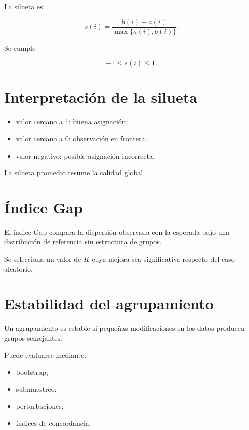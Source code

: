 \documentclass[
  spanish,
  10.5pt,
  letterpaper,
  DIV=11,
  numbers=noendperiod,
  oneside,
  open=any]{scrreprt}
\providecommand{\tightlist}{%
  \setlength{\itemsep}{0pt}\setlength{\parskip}{0pt}}
\theoremstyle{definition}
\theoremstyle{definition}
\theoremstyle{plain}
\theoremstyle{remark}
\begin{document}
La silueta es

\[
s(i)
=
\frac{
b(i)-a(i)
}{
\max\{a(i),b(i)\}
}.
\]

Se cumple

\[
-1\leq s(i)\leq 1.
\]

\section*{Interpretación de la
silueta}\label{interpretaciuxf3n-de-la-silueta}


\begin{itemize}
\tightlist
\item
  valor cercano a 1: buena asignación;
\item
  valor cercano a 0: observación en frontera;
\item
  valor negativo: posible asignación incorrecta.
\end{itemize}

La silueta promedio resume la calidad global.

\section*{Índice Gap}\label{uxedndice-gap}


El índice Gap compara la dispersión observada con la esperada bajo una
distribución de referencia sin estructura de grupos.

Se selecciona un valor de \(K\) cuya mejora sea significativa respecto
del caso aleatorio.

\section*{Estabilidad del
agrupamiento}\label{estabilidad-del-agrupamiento}


Un agrupamiento es estable si pequeñas modificaciones en los datos
producen grupos semejantes.

Puede evaluarse mediante:

\begin{itemize}
\tightlist
\item
  bootstrap;
\item
  submuestreo;
\item
  perturbaciones;
\item
  índices de concordancia.
\end{itemize}
\end{document}
